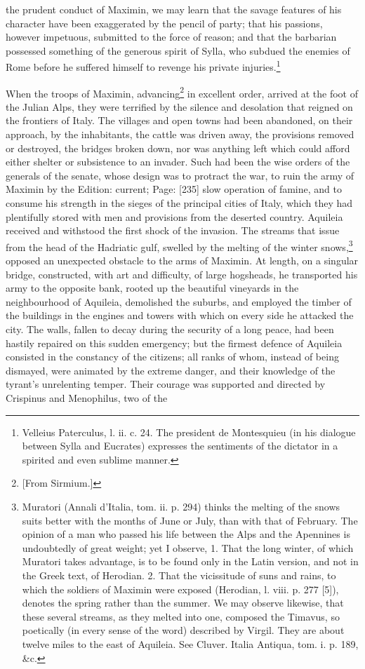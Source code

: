 the prudent conduct of Maximin, we may learn that the savage features of his character have been exaggerated by the pencil of party; that his passions, however impetuous, submitted to the force of reason; and that the barbarian possessed something of the generous spirit of Sylla, who subdued the enemies of Rome before he suffered himself to revenge his private injuries.\footnote{Velleius Paterculus, l. ii. c. 24. The president de Montesquieu (in his dialogue between Sylla and Eucrates) expresses the sentiments of the dictator in a spirited and even sublime manner.}

When the troops of Maximin, advancing\footnote{[From Sirmium.]} in excellent order, arrived at the foot of the Julian Alps, they were terrified by the silence and desolation that reigned on the frontiers of Italy. The villages and open towns had been abandoned, on their approach, by the inhabitants, the cattle was driven away, the provisions removed or destroyed, the bridges broken down, nor was anything left which could afford either shelter or subsistence to an invader. Such had been the wise orders of the generals of the senate, whose design was to protract the war, to ruin the army of Maximin by the Edition: current; Page: [235] slow operation of famine, and to consume his strength in the sieges of the principal cities of Italy, which they had plentifully stored with men and provisions from the deserted country. Aquileia received and withstood the first shock of the invasion. The streams that issue from the head of the Hadriatic gulf, swelled by the melting of the winter snows,\footnote{Muratori (Annali d\texthebrew{}’Italia, tom. ii. p. 294) thinks the melting of the snows suits better with the months of June or July, than with that of February. The opinion of a man who passed his life between the Alps and the Apennines is undoubtedly of great weight; yet I observe, 1. That the long winter, of which Muratori takes advantage, is to be found only in the Latin version, and not in the Greek text, of Herodian. 2. That the vicissitude of suns and rains, to which the soldiers of Maximin were exposed (Herodian, l. viii. p. 277 [5]), denotes the spring rather than the summer. We may observe likewise, that these several streams, as they melted into one, composed the Timavus, so poetically (in every sense of the word) described by Virgil. They are about twelve miles to the east of Aquileia. See Cluver. Italia Antiqua, tom. i. p. 189, \&c.} opposed an unexpected obstacle to the arms of Maximin. At length, on a singular bridge, constructed, with art and difficulty, of large hogsheads, he transported his army to the opposite bank, rooted up the beautiful vineyards in the neighbourhood of Aquileia, demolished the suburbs, and employed the timber of the buildings in the engines and towers with which on every side he attacked the city. The walls, fallen to decay during the security of a long peace, had been hastily repaired on this sudden emergency; but the firmest defence of Aquileia consisted in the constancy of the citizens; all ranks of whom, instead of being dismayed, were animated by the extreme danger, and their knowledge of the tyrant\texthebrew{}’s unrelenting temper. Their courage was supported and directed by Crispinus and Menophilus, two of the 